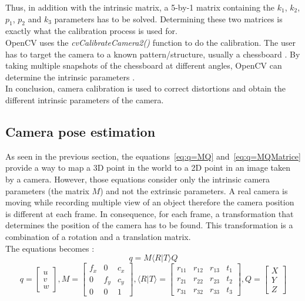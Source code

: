 Thus, in addition with the intrinsic matrix, a 5-by-1 matrix containing the $k_1$, $k_2$, $p_1$, $p_2$ and $k_3$ parameters has to be solved. Determining these two matrices is exactly what the calibration process is used for. \\

OpenCV uses the \textit{cvCalibrateCamera2()} function to do the calibration. The user has to target the camera to a known pattern/structure, usually a chessboard \cite{zhang_flexible_1999}. By taking multiple snapshots of the chessboard at different angles, OpenCV can determine the intrinsic parameters \cite{camera}. \\

In conclusion, camera calibration is used to correct distortions and obtain the different intrinsic parameters of the camera.

\subsection{Camera pose estimation}
\label{sec:Camera pose estimation}

As seen in the previous section, the equations~\ref{eq:q=MQ} and~\ref{eq:q=MQMatrice} provide a way to map a 3D point in the world to a 2D point in an image taken by a camera. However, those equations consider only the intrinsic camera parameters (the matrix $M$) and not the extrinsic parameters. A real camera is moving while recording multiple view of an object therefore the camera position is different at each frame. In consequence, for each frame, a transformation that determines the position of the camera has to be found. This transformation is a combination of a rotation and a translation matrix. \\

The equations becomes \cite{camera1}: 
\begin{equation}
  q = M\langle R\vert T\rangle Q     
\end{equation}
\begin{equation}
  q = \begin{bmatrix}
       u \\
       v \\
       w 
     \end{bmatrix}, 
  M = \begin{bmatrix}
       f_x & 0 & c_x \\
       0 & f_y & c_y \\
       0 & 0 & 1
     \end{bmatrix}, 
  \langle R\vert T\rangle =  \begin{bmatrix}
       r_{11} & r_{12} & r_{13} & t_1 \\
       r_{21} & r_{22} & r_{23} & t_2\\
       r_{31} & r_{32} & r_{33} & t_3
     \end{bmatrix},  
  Q = \begin{bmatrix}
       X \\
       Y \\
       Z 
     \end{bmatrix}     
\end{equation}

